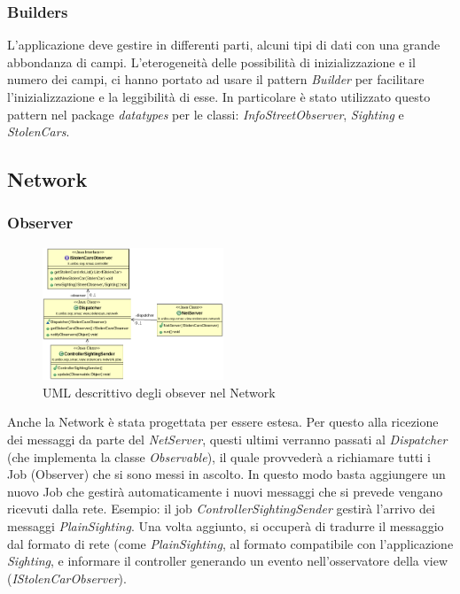 \documentclass[a4paper,12pt]{report}
\begin{document}
    \subsubsection {Builders}
    L'applicazione deve gestire in differenti parti, alcuni tipi di dati con 
una grande abbondanza di campi. L'eterogeneità delle possibilità di 
inizializzazione e il numero dei campi, ci hanno portato ad usare il pattern 
\textit{Builder} per facilitare l'inizializzazione e la leggibilità di 
esse.\newline
    In particolare è stato utilizzato questo pattern nel package 
\textit{datatypes} per le classi: \textit{InfoStreetObserver}, 
\textit{Sighting} e \textit{StolenCars}.
  
  \subsection{Network}
    \subsubsection{Observer}
    \begin{figure}
      \vspace{-40pt}
      \begin{center}
\includegraphics[width=0.48\textwidth]{images/UMLnetworkObserver}
	\caption{UML descrittivo degli obsever nel Network}
	\label{fig:UMLnetworkObserver}
      \end{center}
    \end{figure}
      Anche la Network è stata progettata per essere estesa. Per questo alla 
      ricezione dei messaggi da parte del \textit{NetServer}, questi ultimi 
verranno passati al \textit{Dispatcher} (che implementa la classe 
\textit{Observable}), il quale provvederà a richiamare tutti i Job (Observer) 
che si sono messi in ascolto. In questo modo basta aggiungere un nuovo Job che 
gestirà automaticamente i nuovi messaggi che si prevede vengano ricevuti dalla 
rete. \newline
Esempio: il job \textit{ControllerSightingSender} gestirà l'arrivo dei messaggi 
\textit{PlainSighting}. Una volta aggiunto, si occuperà di tradurre il messaggio 
dal formato di rete (come \textit{PlainSighting}, al formato compatibile con 
l'applicazione \textit{Sighting}, e informare il controller generando un evento 
nell'osservatore della view (\textit{IStolenCarObserver}).
  
\end{document}

